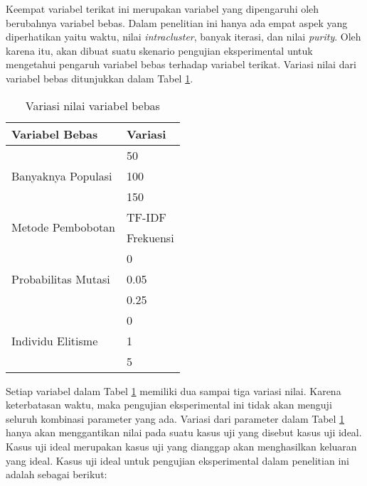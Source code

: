 Keempat variabel terikat ini merupakan variabel yang dipengaruhi oleh berubahnya variabel bebas. Dalam penelitian ini hanya ada empat aspek yang diperhatikan yaitu waktu, nilai \textit{intracluster}, banyak iterasi, dan nilai \textit{purity}. Oleh karena itu, akan dibuat suatu skenario pengujian eksperimental untuk mengetahui pengaruh variabel bebas terhadap variabel terikat. Variasi nilai dari variabel bebas ditunjukkan dalam Tabel \ref{tbl:testScenario}.

\begin{table}[H]
	\centering
	\caption{Variasi nilai variabel bebas}
	\begin{tabular}{|l|l|}
		\hline
		Variabel Bebas                       & Variasi   \\ \hline
		\multirow{3}{*}{Banyaknya Populasi}  & 50        \\ \cline{2-2} 
		                                     & 100       \\ \cline{2-2} 
		                                     & 150       \\ \hline
		\multirow{2}{*}{Metode Pembobotan}   & TF-IDF    \\ \cline{2-2} 
		                                     & Frekuensi \\ \hline
		\multirow{3}{*}{Probabilitas Mutasi} & 0         \\ \cline{2-2} 
		                                     & 0.05      \\ \cline{2-2} 
		                                     & 0.25      \\ \hline
		\multirow{3}{*}{Individu Elitisme}   & 0         \\ \cline{2-2} 
 		                                     & 1         \\ \cline{2-2} 
		                                     & 5         \\ \hline
\end{tabular}
	\label{tbl:testScenario}
\end{table}

Setiap variabel dalam Tabel \ref{tbl:testScenario} memiliki dua sampai tiga variasi nilai. Karena keterbatasan waktu, maka pengujian eksperimental ini tidak akan menguji seluruh kombinasi parameter yang ada. Variasi dari parameter dalam Tabel \ref{tbl:testScenario} hanya akan menggantikan nilai pada suatu kasus uji yang disebut kasus uji ideal. Kasus uji ideal merupakan kasus uji yang dianggap akan menghasilkan keluaran yang ideal. Kasus uji ideal untuk pengujian eksperimental dalam penelitian ini adalah sebagai berikut:

